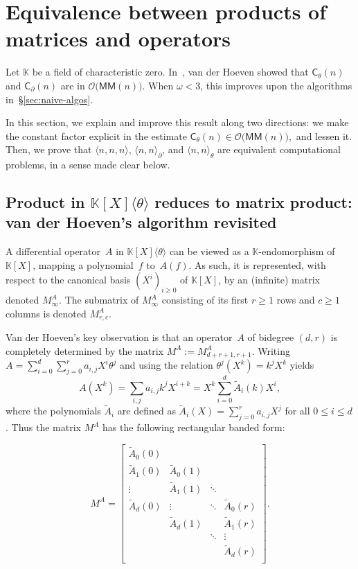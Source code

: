 \documentclass{sig-alt-full}
\newcommand{\x}{X}
\newcommand{\Tx}{\theta}
\newcommand{\Dx}{\partial}
\newcommand{\bigO}{{\mathcal{O}}}
\newcommand{\MM}{\mathsf{MM}}
\def\OMul#1#2#3{\langle #1,#2 \rangle_{#3}}
\def\MMul#1#2#3{\langle #1,#2,#3 \rangle}
\newcommand{\sC}{\mathsf{C}}
\newcommand{\bK}{\mathbb{K}}
\begin{document}
\section{Equivalence between products of matrices and operators}
\label{sec:equiv}
Let $\bK$ be a field of characteristic zero.
In~\cite{vdHoeven02}, van der Hoeven showed that $\sC_\Tx(n)$ and $\sC_\Dx(n)$ are in $\bigO\bigl(\MM(n)\bigr)$.
When $\omega < 3$, this improves upon the algorithms in~\S\ref{sec:naive-algos}.

In this section, we explain and improve this result along two directions: we make the constant factor explicit  in the estimate  $\sC_\Tx(n)\in \bigO\bigl(\MM(n)\bigr),$ and lessen it.
Then, we prove that $\MMul nnn$, $\OMul nn\Dx$, and $\OMul nn\Tx$ are equivalent computational problems, in a sense made clear below.

\subsection{Product in  $ \bK[\x]\langle \Tx  \rangle$ reduces to matrix product: van der Hoeven's algorithm revisited}\label{ssec:OperToMat}

A differential operator~$A$ in $\bK[\x]\langle\Tx\rangle$ can be viewed as a $\bK$-endomorphism of~$\bK[\x]$, mapping a polynomial~$f$ to~$A(f)$.
As such, it is represented, with respect to the canonical basis $(\x^i)_{i \geq 0}$ of $\bK[\x]$, by an (infinite) matrix  denoted $M_\infty^A$.
The submatrix of $M_\infty^A$ consisting of its first $r\geq 1$ rows and $c\geq 1$ columns is denoted $M_{r,c}^A$.

Van der Hoeven's key observation is that an operator~$A$ of bidegree $(d,r)$ is completely determined by the matrix  $M^A:= M_{d+r+1,r+1}^A$.
Writing $A=\sum_{i=0}^d \sum_{j=0}^r a_{i,j} \x^i \Tx^j$ and using the relation $\Tx^j(\x^k) = k^j \x^k$ yields
\[A(\x^k) = \sum_{i,j} a_{i,j} k^j  \x^{i+k} = \x^k \sum_{i=0}^d \tilde A_i(k) \x^i,\]
where the polynomials $\tilde A_i$ are defined as $\tilde A_i(\x) = \sum_{j=0}^r a_{i,j}\x^j$ for all $0\leq i \leq d$.
Thus the matrix $M^A$ has the following rectangular banded form:

\begin{equation} \label{matrixdef}
M^A =
\left[
\begin{array}{cccc}
 \tilde A_0(0) & & &  \\
\tilde A_1(0) & \tilde A_0(1) & & \\
\vdots & \tilde A_1(1) & \ddots  & \\
\tilde A_d(0) &  \vdots  &  \ddots &\tilde A_0(r)  \\
 & \tilde A_d(1)  &  &\tilde A_1(r)  \\
 & & \ddots & \vdots \\
 & & & \tilde A_d(r)\\
 \end{array}
\right].
\end{equation}
\end{document}
